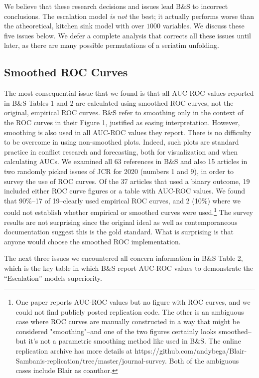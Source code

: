 \documentclass[
]{article}
\begin{document}
We believe that these research decisions and issues lead B\&S to incorrect conclusions. The escalation model \textit{is not} the best; it actually performs worse than the atheoretical, kitchen sink model with over \(1000\) variables. We discuss these five issues below. We defer a complete analysis that corrects all these issues until later, as there are many possible permutations of a seriatim unfolding.

\hypertarget{smoothed-roc-curves}{%
\subsection{Smoothed ROC Curves}\label{smoothed-roc-curves}}

The most consequential issue that we found is that all AUC-ROC values reported in B\&S Tables 1 and 2 are calculated using smoothed ROC curves, not the original, empirical ROC curves. B\&S refer to smoothing only in the context of the ROC curves in their Figure 1, justified as easing interpretation. However, smoothing is also used in all AUC-ROC values they report. There is no difficulty to be overcome in using non-smoothed plots. Indeed, such plots are standard practice in conflict research and forecasting, both for visualization and when calculating AUCs. We examined all 63 references in B\&S and also 15 articles in two randomly picked issues of JCR for 2020 (numbers 1 and 9), in order to survey the use of ROC curves. Of the 37 articles that used a binary outcome, 19 included either ROC curve figures or a table with AUC-ROC values. We found that 90\%--17 of 19--clearly used empirical ROC curves, and 2 (10\%) where we could not establish whether empirical or smoothed curves were used.\footnote{One paper reports AUC-ROC values but no figure with ROC curves, and we could not find publicly posted replication code. The other is an ambiguous case where ROC curves are manually constructed in a way that might be considered "smoothing"--and one of the two figures certainly looks smoothed--but it's not a parametric smoothing method like used in B\&S. The online replication archive has more details at https://github.com/andybega/Blair-Sambanis-replication/tree/master/journal-survey. Both of the ambiguous cases include Blair as coauthor.} The survey results are not surprising since the original ideal as well as contemporaneous documentation suggest this is the gold standard. What is surprising is that anyone would choose the smoothed ROC implementation.

The next three issues we encountered all concern information in B\&S Table 2, which is the key table in which B\&S report AUC-ROC values to demonstrate the ``Escalation'' models superiority.
\end{document}
